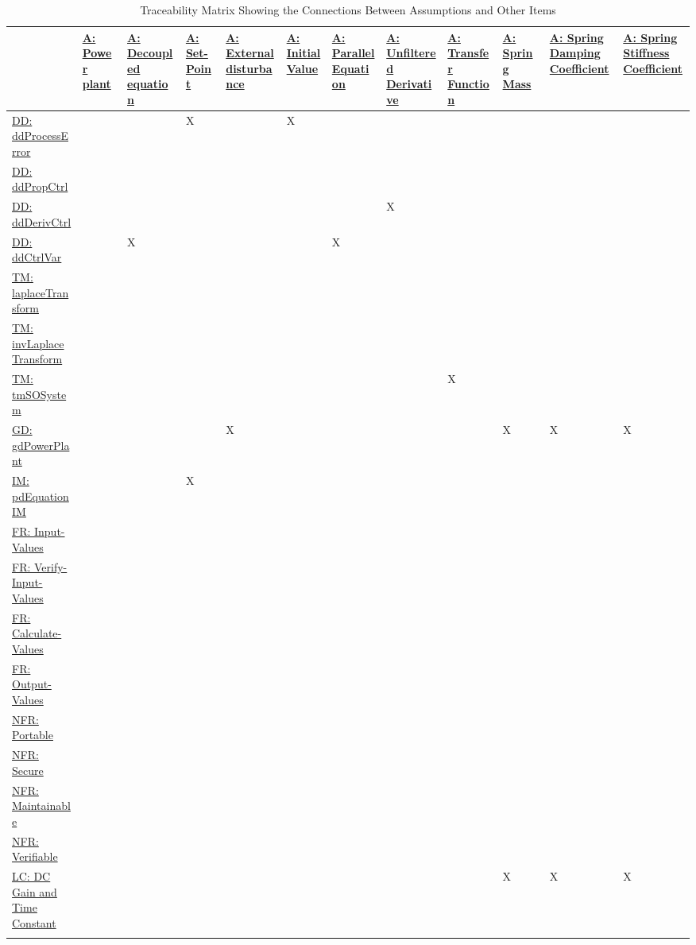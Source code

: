 \documentclass[12pt]{article}
\begin{document}
\begin{longtable}{l l l l l l l l l l l l}
\toprule
\textbf{} & \textbf{\hyperref[pwrPlant]{A: Power plant}} & \textbf{\hyperref[decoupled]{A: Decoupled equation}} & \textbf{\hyperref[setPoint]{A: Set-Point}} & \textbf{\hyperref[externalDisturb]{A: External disturbance}} & \textbf{\hyperref[initialValue]{A: Initial Value}} & \textbf{\hyperref[parallelEq]{A: Parallel Equation}} & \textbf{\hyperref[unfilteredDerivative]{A: Unfiltered Derivative}} & \textbf{\hyperref[pwrPlantTxFnx]{A: Transfer Function}} & \textbf{\hyperref[massSpring]{A: Spring Mass}} & \textbf{\hyperref[dampingCoeffSpring]{A: Spring Damping Coefficient}} & \textbf{\hyperref[stiffnessCoeffSpring]{A: Spring Stiffness Coefficient}}
\\
\midrule
\endhead
\hyperref[DD:ddProcessError]{DD: ddProcessError} &  &  & X &  & X &  &  &  &  &  & 
\\
\hyperref[DD:ddPropCtrl]{DD: ddPropCtrl} &  &  &  &  &  &  &  &  &  &  & 
\\
\hyperref[DD:ddDerivCtrl]{DD: ddDerivCtrl} &  &  &  &  &  &  & X &  &  &  & 
\\
\hyperref[DD:ddCtrlVar]{DD: ddCtrlVar} &  & X &  &  &  & X &  &  &  &  & 
\\
\hyperref[TM:laplaceTransform]{TM: laplaceTransform} &  &  &  &  &  &  &  &  &  &  & 
\\
\hyperref[TM:invLaplaceTransform]{TM: invLaplaceTransform} &  &  &  &  &  &  &  &  &  &  & 
\\
\hyperref[TM:tmSOSystem]{TM: tmSOSystem} &  &  &  &  &  &  &  & X &  &  & 
\\
\hyperref[GD:gdPowerPlant]{GD: gdPowerPlant} &  &  &  & X &  &  &  &  & X & X & X
\\
\hyperref[IM:pdEquationIM]{IM: pdEquationIM} &  &  & X &  &  &  &  &  &  &  & 
\\
\hyperref[inputValues]{FR: Input-Values} &  &  &  &  &  &  &  &  &  &  & 
\\
\hyperref[verifyInputs]{FR: Verify-Input-Values} &  &  &  &  &  &  &  &  &  &  & 
\\
\hyperref[calculateValues]{FR: Calculate-Values} &  &  &  &  &  &  &  &  &  &  & 
\\
\hyperref[outputValues]{FR: Output-Values} &  &  &  &  &  &  &  &  &  &  & 
\\
\hyperref[portability]{NFR: Portable} &  &  &  &  &  &  &  &  &  &  & 
\\
\hyperref[security]{NFR: Secure} &  &  &  &  &  &  &  &  &  &  & 
\\
\hyperref[maintainability]{NFR: Maintainable} &  &  &  &  &  &  &  &  &  &  & 
\\
\hyperref[verifiability]{NFR: Verifiable} &  &  &  &  &  &  &  &  &  &  & 
\\
\hyperref[likeChgPP]{LC: DC Gain and Time Constant} &  &  &  &  &  &  &  &  & X & X & X
\\
\bottomrule
\caption{Traceability Matrix Showing the Connections Between Assumptions and Other Items}
\label{Table:TraceMatAvsAll}
\end{longtable}
\end{document}
